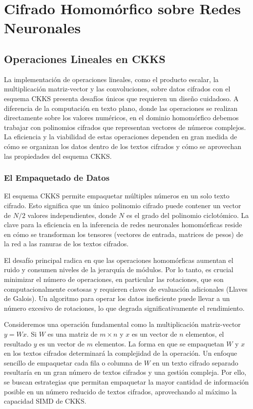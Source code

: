 \chapter{Cifrado Homomórfico sobre Redes Neuronales}

\section{Operaciones Lineales en CKKS}

La implementación de operaciones lineales, como el producto escalar, la multiplicación matriz-vector y las convoluciones, sobre datos cifrados con el esquema CKKS \cite{CKKS17} presenta desafíos únicos que requieren un diseño cuidadoso. A diferencia de la computación en texto plano, donde las operaciones se realizan directamente sobre los valores numéricos, en el dominio homomórfico debemos trabajar con polinomios cifrados que representan vectores de números complejos. La eficiencia y la viabilidad de estas operaciones dependen en gran medida de cómo se organizan los datos dentro de los textos cifrados y cómo se aprovechan las propiedades del esquema CKKS.

\subsection{El Empaquetado de Datos}

El esquema CKKS permite empaquetar múltiples números en un solo texto cifrado. Esto significa que un único polinomio cifrado puede contener un vector de $N/2$ valores independientes, donde $N$ es el grado del polinomio ciclotómico. La clave para la eficiencia en la inferencia de redes neuronales homomórficas reside en cómo se transforman los tensores (vectores de entrada, matrices de pesos) de la red a las ranuras de los textos cifrados.

El desafío principal radica en que las operaciones homomórficas aumentan el ruido y consumen niveles de la jerarquía de módulos. Por lo tanto, es crucial minimizar el número de operaciones, en particular las rotaciones, que son computacionalmente costosas y requieren claves de evaluación adicionales (Llaves de Galois). Un algoritmo para operar los datos ineficiente puede llevar a un número excesivo de rotaciones, lo que degrada significativamente el rendimiento.

Consideremos una operación fundamental como la multiplicación matriz-vector $y = Wx$. Si $W$ es una matriz de $m \times n$ y $x$ es un vector de $n$ elementos, el resultado $y$ es un vector de $m$ elementos. La forma en que se empaquetan $W$ y $x$ en los textos cifrados determinará la complejidad de la operación. Un enfoque sencillo de empaquetar cada fila o columna de $W$ en un texto cifrado separado resultaría en un gran número de textos cifrados y una gestión compleja. Por ello, se buscan estrategias que permitan empaquetar la mayor cantidad de información posible en un número reducido de textos cifrados, aprovechando al máximo la capacidad SIMD de CKKS.

